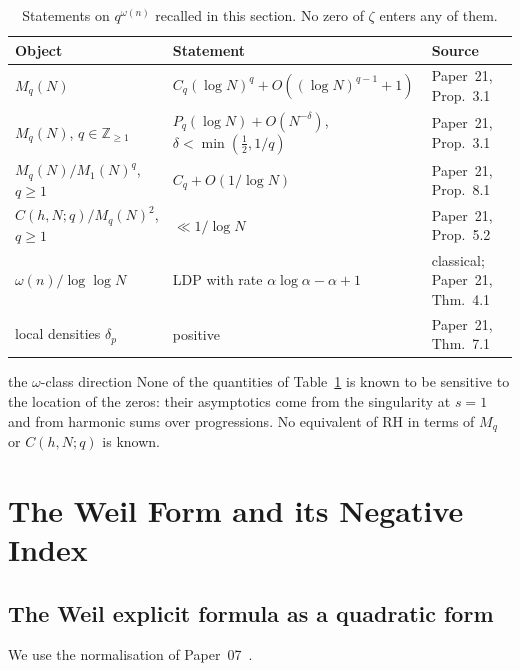 \documentclass[11pt]{amsart}
\theoremstyle{definition}
\theoremstyle{remark}
\newcommand{\half}{\tfrac{1}{2}}
\newcommand{\om}{\omega}
\begin{document}
\begin{table}[h]
\centering
\small
\renewcommand{\arraystretch}{1.3}
\begin{tabularx}{\textwidth}{>{\raggedright\arraybackslash}p{4.2cm}>{\raggedright\arraybackslash}X>{\raggedright\arraybackslash}p{3.2cm}}
\toprule
Object & Statement & Source \\
\midrule
$M_q(N)$ & $C_q(\log N)^q+O((\log N)^{q-1}+1)$ & Paper~21, Prop.~3.1 \\
$M_q(N)$, $q\in\mathbb Z_{\ge1}$ & $P_q(\log N)+O(N^{-\delta})$, $\delta<\min(\half,1/q)$ & Paper~21, Prop.~3.1 \\
$M_q(N)/M_1(N)^q$, $q\ge1$ & $C_q+O(1/\log N)$ & Paper~21, Prop.~8.1 \\
$C(h,N;q)/M_q(N)^2$, $q\ge1$ & $\ll1/\log N$ & Paper~21, Prop.~5.2 \\
$\om(n)/\log\log N$ & LDP with rate $\alpha\log\alpha-\alpha+1$ & classical; Paper~21, Thm.~4.1 \\
local densities $\delta_p$ & positive & Paper~21, Thm.~7.1 \\
\bottomrule
\end{tabularx}
\caption{Statements on $q^{\om(n)}$ recalled in this section. No zero of $\zeta$ enters
any of them.}
\label{tab:omega-class}
\end{table}

\begin{wallbox}{the $\omega$-class direction}
None of the quantities of Table~\ref{tab:omega-class} is known to be sensitive to the
location of the zeros: their asymptotics come from the singularity at $s=1$ and from
harmonic sums over progressions. No equivalent of RH in terms of $M_q$ or $C(h,N;q)$ is
known.
\end{wallbox}

\section{The Weil Form and its Negative Index}
\label{sec:Weil}

\subsection{The Weil explicit formula as a quadratic form}
\label{ss:Weil}

We use the normalisation of Paper~07~\cite{P07}.
\end{document}
